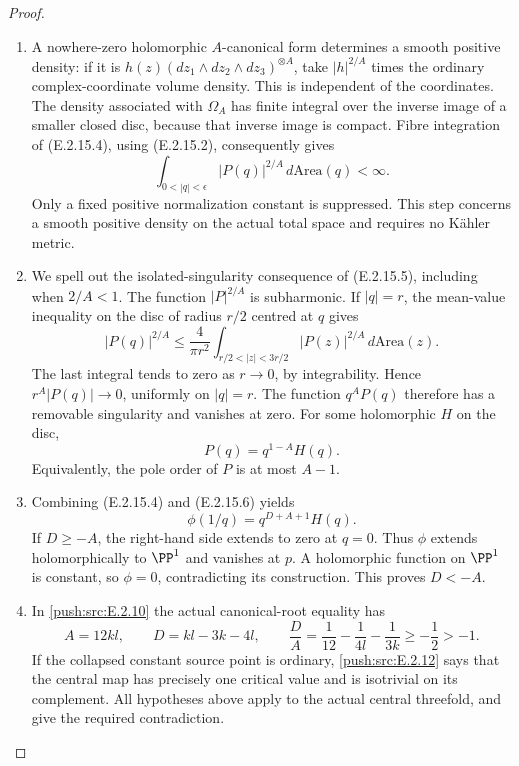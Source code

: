 \begin{proof}
\begin{enumerate}[label={$\langle1\rangle$\arabic*.},leftmargin=*]
\item A nowhere-zero holomorphic $A$-canonical form determines
a smooth positive density: if it is
$h(z)(dz_1\wedge dz_2\wedge dz_3)^{\otimes A}$, take
$|h|^{2/A}$ times the ordinary complex-coordinate volume
density.  This is independent of the coordinates.  The
density associated with $\Omega_A$ has finite integral
over the inverse image of a smaller closed disc, because
that inverse image is compact.  Fibre integration of
(E.2.15.4), using (E.2.15.2), consequently gives
\[
 \int_{0<|q|<\epsilon}|P(q)|^{2/A}\,d\mathrm{Area}(q)
 <\infty.
 \tag{E.2.15.5}
\]
Only a fixed positive normalization constant is suppressed.
This step concerns a smooth positive density on the actual
total space and requires no K\"ahler metric.

\item We spell out the isolated-singularity consequence of
(E.2.15.5), including when $2/A<1$.  The function
$|P|^{2/A}$ is subharmonic.  If $|q|=r$, the mean-value
inequality on the disc of radius $r/2$ centred at $q$ gives
\[
 |P(q)|^{2/A}
 \leq \frac{4}{\pi r^2}
       \int_{r/2<|z|<3r/2}|P(z)|^{2/A}\,d\mathrm{Area}(z).
\]
The last integral tends to zero as $r\to0$, by
integrability.  Hence $r^A|P(q)|\to0$, uniformly on
$|q|=r$.  The function $q^A P(q)$ therefore has a removable
singularity and vanishes at zero.  For some holomorphic
$H$ on the disc,
\[
 P(q)=q^{1-A}H(q).
 \tag{E.2.15.6}
\]
Equivalently, the pole order of $P$ is at most $A-1$.

\item Combining (E.2.15.4) and (E.2.15.6) yields
\[
 \phi(1/q)=q^{D+A+1}H(q).
 \tag{E.2.15.7}
\]
If $D\geq-A$, the right-hand side extends to zero at
$q=0$.  Thus $\phi$ extends holomorphically to $\PP^1$
and vanishes at $p$.  A holomorphic function on $\PP^1$
is constant, so $\phi=0$, contradicting its construction.
This proves $D<-A$.

\item In \ref{push:src:E.2.10} the actual canonical-root equality has
\[
 A=12kl,\qquad D=kl-3k-4l,
 \qquad
 \frac DA=\frac1{12}-\frac1{4l}-\frac1{3k}
       \geq-\frac12>-1.
\]
If the collapsed constant source point is ordinary,
\ref{push:src:E.2.12} says that the central map has precisely one
critical value and is isotrivial on its complement.
All hypotheses above apply to the actual central
threefold, and give the required contradiction.

\end{enumerate}
\end{proof}
